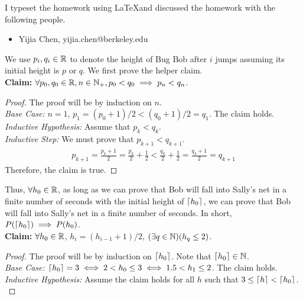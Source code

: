 \documentclass[11pt]{article}
\begin{document}

    \begin{Answer}
        I typeset the homework using \LaTeX and discussed the homework with the following people. 
        \begin{itemize}
            \item Yijia Chen, yijia.chen@berkeley.edu
        \end{itemize}
    \end{Answer}

    \newpage

    \begin{Answer}
        We use $p_i,q_i \in \mathbb{R}$ to denote the height of Bug Bob after $i$ jumps assuming its initial height is $p$ or $q$. 
        We first prove the helper claim.\\
        \textbf{Claim:} $\forall p_0,q_0 \in \mathbb{R}, n \in \mathbb{N}_+, p_0 < q_0 \implies p_n < q_n$.
		\begin{proof}
			The proof will be by induction on $n$.  \\
			\emph{Base Case:} $n = 1$, $p_1 = (p_0 + 1) / 2 < (q_0 + 1) / 2 = q_1$. The claim holds.  \\
			\emph{Inductive Hypothesis:} Assume that $p_k < q_k$. \\
            \emph{Inductive Step:} We must prove that $p_{k+1} < q_{k+1}$.
            \begin{align*}
				p_{k+1}=\frac{p_k+1}{2}=\frac{p_k}{2}+\frac{1}{2}<\frac{q_k}{2}+\frac{1}{2}=\frac{q_k+1}{2}=q_{k+1}
            \end{align*}
            Therefore, the claim is true.
        \end{proof}
        Thus, $\forall h_0 \in \mathbb{R}$, as long as we can prove that Bob will fall into Sally's net in a finite
        number of seconds with the initial height of $\lceil h_0\rceil$, we can prove that Bob will fall into Sally's
        net in a finite number of seconds. In short, $P(\lceil h_0\rceil) \implies P(h_0)$. \\ 
        \textbf{Claim:} $\forall h_0 \in \mathbb{R}$, $h_i=(h_{i-1}+1)/2$, $(\exists q \in \mathbb{N})(h_q \leq 2)$.
        \begin{proof}
            The proof will be by induction on $\lceil h_0\rceil$. Note that $\lceil h_0\rceil \in \mathbb{N}$. \\
            \emph{Base Case:} $\lceil h_0\rceil = 3 \iff 2<h_0\leq 3 \iff 1.5<h_1\leq 2$. The claim holds. \\
            \emph{Inductive Hypothesis:} Assume the claim holds for all $h$ such that $3 \leq \lceil h\rceil < \lceil h_0\rceil$. \\

\end{proof}
\end{Answer}
\end{document}
